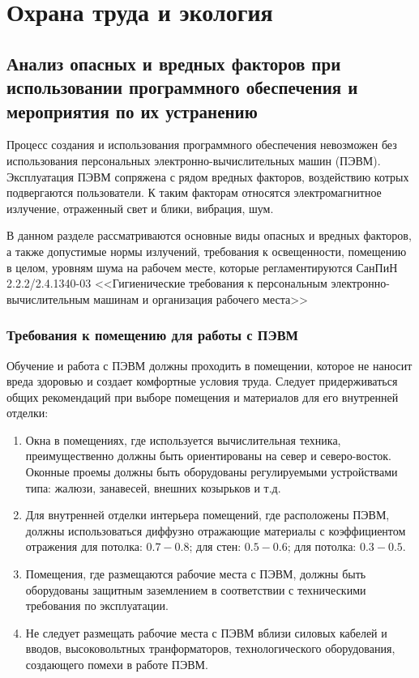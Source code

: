 \chapter{Охрана труда и экология}
\label{cha:ecolog}

\section{Анализ опасных и вредных факторов при использовании программного
	обеспечения и мероприятия по их устранению}
Процесс создания и использования программного обеспечения невозможен без использования
персональных электронно-вычислительных машин (ПЭВМ). Эксплуатация ПЭВМ
сопряжена с рядом вредных факторов, воздействию котрых подвергаются
пользователи. К таким факторам относятся электромагнитное излучение,
отраженный свет и блики, вибрация, шум.

В данном разделе рассматриваются основные виды опасных и вредных факторов, а
также допустимые нормы излучений, требования к освещенности, помещению в
целом, уровням шума на рабочем месте, которые регламентируются СанПиН
2.2.2/2.4.1340-03 <<Гигиенические требования к персональным
электронно-вычислительным машинам и организация рабочего места>>

\subsection{Требования к помещению для работы с ПЭВМ}
Обучение и работа с ПЭВМ должны проходить в помещении, которое не наносит
вреда здоровью и создает комфортные условия труда. Следует придерживаться
общих рекомендаций при выборе помещения и материалов для его внутренней
отделки:
\begin{enumerate}
\item Окна в помещениях, где используется вычислительная техника,
	преимущественно должны быть ориентированы на север и северо-восток.
	Оконные проемы должны быть оборудованы регулируемыми устройствами
	типа: жалюзи, занавесей, внешних козырьков и т.д.

\item Для внутренней отделки интерьера помещений, где расположены ПЭВМ, должны
	использоваться диффузно отражающие материалы с коэффициентом отражения
	для потолка: $0.7 - 0.8$; для стен: $0.5 - 0.6$; для потолка: $0.3 -
	0.5$.
\item Помещения, где размещаются рабочие места с ПЭВМ, должны быть оборудованы
	защитным заземлением в соответствии с техническими требования по
	эксплуатации.
\item Не следует размещать рабочие места с ПЭВМ вблизи силовых кабелей и
	вводов, высоковольтных транформаторов, технологического оборудования,
	создающего помехи в работе ПЭВМ.
\end{enumerate}

